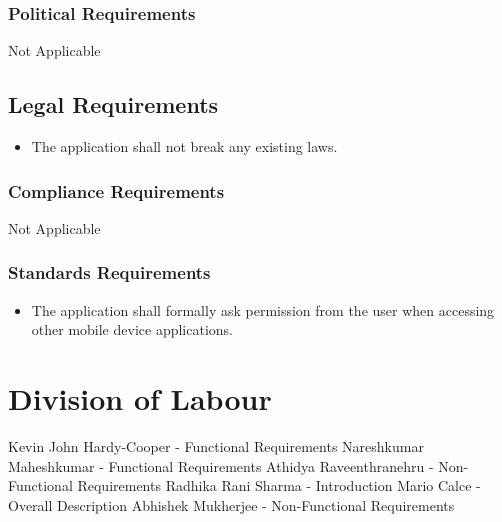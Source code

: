 \documentclass[]{article}
\begin{document}
\subsubsection{Political Requirements}
\label{ssub:political_requirements}
Not Applicable


\subsection{Legal Requirements}
\label{sub:legal_requirements}

\begin{itemize}
	\item The application shall not break any existing laws.
\end{itemize}
\subsubsection{Compliance Requirements}
\label{ssub:compliance_requirements}
Not Applicable

\subsubsection{Standards Requirements}
\label{ssub:standards_requirements}
\begin{itemize}
	\item The application shall formally ask permission from the user when accessing other mobile device applications.
\end{itemize}



\appendix
\section{Division of Labour}
\label{sec:division_of_labour}
Kevin John Hardy-Cooper - Functional Requirements
\newline Nareshkumar Maheshkumar - Functional Requirements
\newline Athidya Raveenthranehru - Non-Functional Requirements
\newline Radhika Rani Sharma - Introduction
\newline Mario Calce - Overall Description
\newline Abhishek Mukherjee - Non-Functional Requirements
\end{document}
